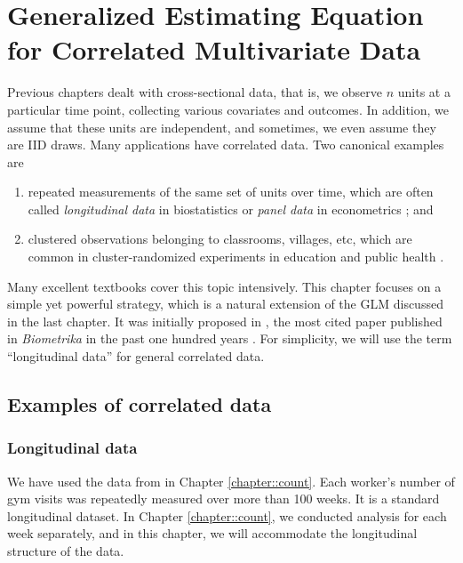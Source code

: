  
\chapter{Generalized Estimating Equation for Correlated Multivariate Data}\label{chapter::gee}
 
Previous chapters dealt with cross-sectional data, that is, we observe $n$ units at a particular time point, collecting various covariates and outcomes. In addition, we assume that these units are independent, and sometimes, we even assume they are IID draws. Many applications have correlated data. Two canonical examples are 
\begin{enumerate}
[(E1)]
\item
repeated measurements of the same set of units over  time, which are often called {\it longitudinal data} in biostatistics \citep{fitzmaurice2012applied} or {\it panel data} in econometrics \citep{wooldridge2010econometric}; and
\item
clustered observations belonging to classrooms, villages, etc, which are common in cluster-randomized experiments in education \citep{schochet2013estimators} and public health \citep{turner2017reviewdesign, turner2017reviewanalysis}. 
\end{enumerate}
Many excellent textbooks cover this topic intensively. This chapter focuses on a simple yet powerful strategy, which is a natural extension of the GLM discussed in the last chapter. It was initially proposed in \citet{liang1986longitudinal}, the most cited paper published in {\it Biometrika} in the past one hundred years \citep{titterington2013biometrika}. 
For simplicity, we will use the term ``longitudinal data'' for general correlated data. 


 
 
\section{Examples of correlated data} 
 
 
 
\subsection{Longitudinal data}

We have used the data from \citet{royer2015incentives} in Chapter \ref{chapter::count}. Each worker's number of gym visits was repeatedly measured over more than 100 weeks. It is a standard longitudinal dataset. In Chapter \ref{chapter::count}, we conducted analysis for each week separately, and in this chapter, we will accommodate the longitudinal structure of the data. 



